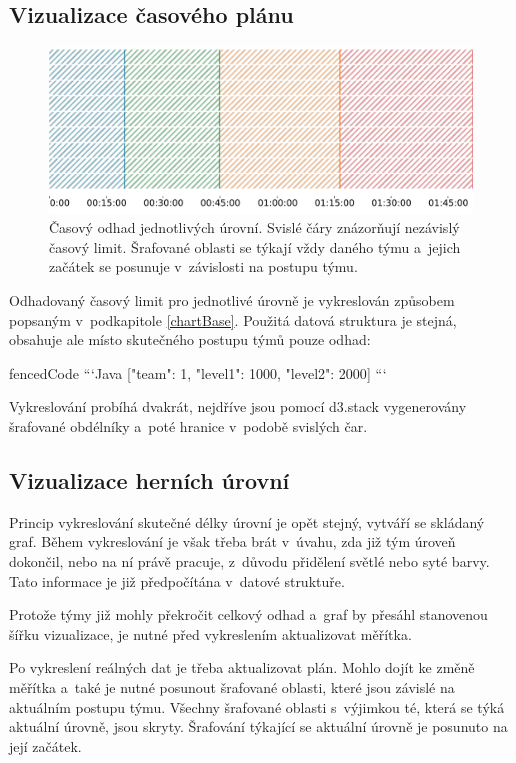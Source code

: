 \documentclass[
  digital, %
  oneside, %
  table,   %
  nolof,     %
  nolot,     %
]{fithesis3}
\begin{document}
\subsection{Vizualizace časového plánu}
\begin{figure}[H]
  \begin{center}
    \includegraphics[width=12.7cm]{images/ctf-plan.pdf}
  \end{center}
  \caption{Časový odhad jednotlivých úrovní. Svislé čáry znázorňují nezávislý časový limit. Šrafované oblasti se týkají vždy daného týmu a~jejich začátek se posunuje v~závislosti na postupu týmu.}
  \label{fig:visualizationChart}
\end{figure}
Odhadovaný časový limit pro jednotlivé úrovně je vykreslován způsobem popsaným v~podkapitole \ref{chartBase}. Použitá datová struktura je stejná, obsahuje ale místo skutečného postupu týmů pouze odhad:
\begin{markdown*}{
  fencedCode
}
```Java
[{"team": 1, "level1": 1000, "level2": 2000}]
```
\end{markdown*}
Vykreslování probíhá dvakrát, nejdříve jsou pomocí d3.stack vygenerovány šrafované obdélníky a~poté hranice v~podobě svislých čar.

\subsection{Vizualizace herních úrovní}
Princip vykreslování skutečné délky úrovní je opět stejný, vytváří se skládaný graf. Během vykreslování je však třeba brát v~úvahu, zda již tým úroveň dokončil, nebo na ní právě pracuje, z~důvodu přidělení světlé nebo syté barvy. Tato informace je již předpočítána v~datové struktuře.\par
Protože týmy již mohly překročit celkový odhad a~graf by přesáhl stanovenou šířku vizualizace, je nutné před vykreslením aktualizovat měřítka.\par
Po vykreslení reálných dat je třeba aktualizovat plán. Mohlo dojít ke změně měřítka a~také je nutné posunout šrafované oblasti, které jsou závislé na aktuálním postupu týmu. Všechny šrafované oblasti s~výjimkou té, která se týká aktuální úrovně, jsou skryty. Šrafování týkající se aktuální úrovně je posunuto na její začátek.
\end{document}
